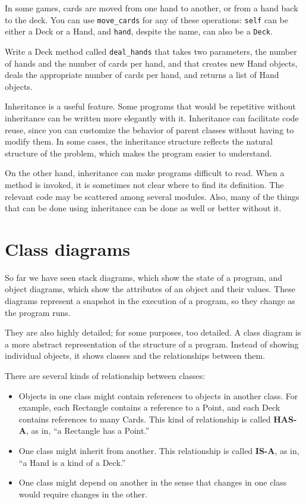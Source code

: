 \documentclass[10pt]{book}
\begin{document}
In some games, cards are moved from one hand to another,
or from a hand back to the deck.  You can use \verb"move_cards"
for any of these operations: {\tt self} can be either a Deck
or a Hand, and {\tt hand}, despite the name, can also be a {\tt Deck}.

\begin{ex}
Write a Deck method called \verb"deal_hands" that takes two
parameters, the number of hands and the number of cards per
hand, and that creates new Hand objects, deals the appropriate
number of cards per hand, and returns a list of Hand objects.
\end{ex}

Inheritance is a useful feature.  Some programs that would be
repetitive without inheritance can be written more elegantly
with it.  Inheritance can facilitate code reuse, since you can
customize the behavior of parent classes without having to modify
them.  In some cases, the inheritance structure reflects the natural
structure of the problem, which makes the program easier to
understand.

On the other hand, inheritance can make programs difficult to read.
When a method is invoked, it is sometimes not clear where to find its
definition.  The relevant code may be scattered among several modules.
Also, many of the things that can be done using inheritance can be
done as well or better without it.  


\section{Class diagrams}

So far we have seen stack diagrams, which show the state of
a program, and object diagrams, which show the attributes
of an object and their values.  These diagrams represent a snapshot
in the execution of a program, so they change as the program
runs.

They are also highly detailed; for some purposes, too
detailed.  A class diagram is a more abstract representation
of the structure of a program.  Instead of showing individual
objects, it shows classes and the relationships between them.

There are several kinds of relationship between classes:

\begin{itemize}

\item Objects in one class might contain references to objects
in another class.  For example, each Rectangle contains a reference
to a Point, and each Deck contains references to many Cards.
This kind of relationship is called {\bf HAS-A}, as in, ``a Rectangle
has a Point.''

\item One class might inherit from another.  This relationship
is called {\bf IS-A}, as in, ``a Hand is a kind of a Deck.''

\item One class might depend on another in the sense that changes
in one class would require changes in the other.

\end{itemize}
\end{document}
